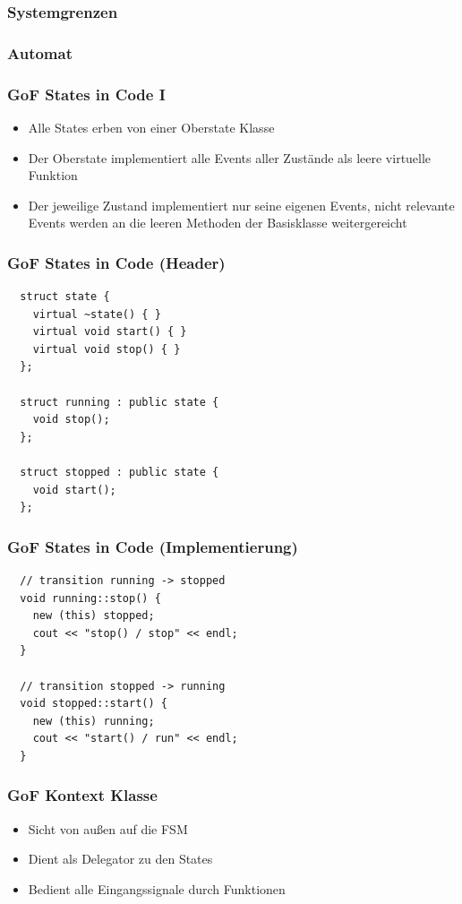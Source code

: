 \documentclass{beamer}
\begin{document}
\begin{frame}
 \frametitle{Systemgrenzen}
\end{frame}

\begin{frame}
 \frametitle{Automat}
\end{frame}

\begin{frame}
 \frametitle{GoF States in Code I}
 \begin{itemize}
  \item Alle States erben von einer Oberstate Klasse
  \item Der Oberstate implementiert alle Events aller Zustände als leere virtuelle Funktion
  \item Der jeweilige Zustand implementiert nur seine eigenen Events, nicht relevante
  Events werden an die leeren Methoden der Basisklasse weitergereicht
 \end{itemize}
\end{frame}

\begin{frame}[fragile]
 \frametitle{GoF States in Code (Header)}
 \begin{lstlisting}
  struct state {
    virtual ~state() { }
    virtual void start() { }
    virtual void stop() { }
  };

  struct running : public state {
    void stop();
  };

  struct stopped : public state {
    void start();
  };
 \end{lstlisting}
\end{frame}

\begin{frame}[fragile]
 \frametitle{GoF States in Code (Implementierung)}
 \begin{lstlisting}
  // transition running -> stopped
  void running::stop() {
    new (this) stopped;
    cout << "stop() / stop" << endl;
  }

  // transition stopped -> running
  void stopped::start() {
    new (this) running;
    cout << "start() / run" << endl;
  }
 \end{lstlisting}
\end{frame}

\begin{frame}
 \frametitle{GoF Kontext Klasse}
 \begin{itemize}
  \item Sicht von au{\ss}en auf die FSM
  \item Dient als Delegator zu den States
  \item Bedient alle Eingangssignale durch Funktionen
 \end{itemize}
\end{frame}
\end{document}
